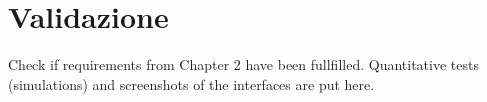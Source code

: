 
\chapter{Validazione}

Check if requirements from Chapter 2 have been fullfilled. Quantitative tests (simulations) and screenshots of the interfaces are put here.